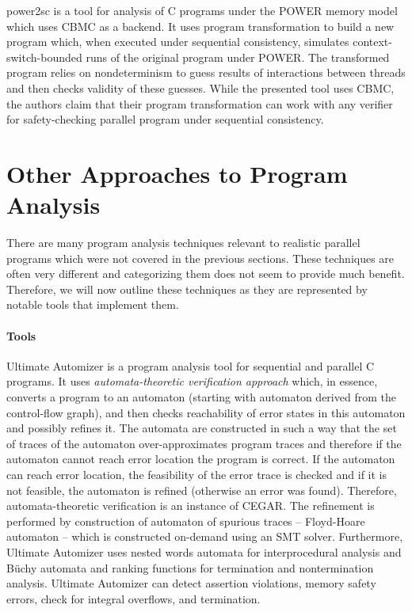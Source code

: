 power2sc  is a tool for analysis of C programs under the POWER memory model which uses CBMC as a backend.
It uses program transformation to build a new program which, when executed under sequential consistency, simulates context-switch-bounded runs of the original program under POWER.
The transformed program relies on nondeterminism to guess results of interactions between threads and then checks validity of these guesses.
While the presented tool uses CBMC, the authors claim that their program transformation can work with any verifier for safety-checking parallel program under sequential consistency.


\section{Other Approaches to Program Analysis}

There are many program analysis techniques relevant to realistic parallel programs which were not covered in the previous sections.
These techniques are often very different and categorizing them does not seem to provide much benefit.
Therefore, we will now outline these techniques as they are represented by notable tools that implement them.

\paragraph{Tools}

Ultimate Automizer  is a program analysis tool for sequential and parallel C programs.
It uses \emph{automata-theoretic verification approach} which, in essence, converts a program to an automaton (starting with automaton derived from the control-flow graph), and then checks reachability of error states in this automaton and possibly refines it.
The automata are constructed in such a way that the set of traces of the automaton over-approximates program traces and therefore if the automaton cannot reach error location the program is correct.
If the automaton can reach error location, the feasibility of the error trace is checked and if it is not feasible, the automaton is refined (otherwise an error was found).
Therefore, automata-theoretic verification is an instance of CEGAR.
The refinement is performed by construction of automaton of spurious traces -- Floyd-Hoare automaton -- which is constructed on-demand using an SMT solver.
Furthermore, Ultimate Automizer uses nested words automata for interprocedural analysis and Büchy automata and ranking functions for termination and nontermination analysis.
Ultimate Automizer can detect assertion violations, memory safety errors, check for integral overflows, and termination.

